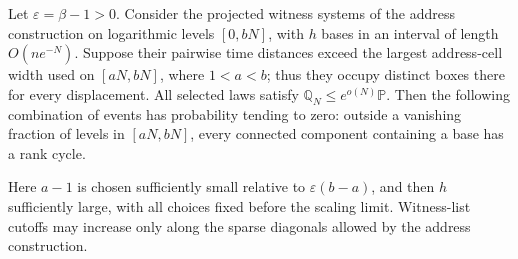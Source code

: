 \begin{proposition}\label{arm:rank-credit}
Let $\varepsilon=\beta-1>0$.  Consider the projected witness systems
of the address construction on logarithmic levels $[0,bN]$, with
$h$ bases in an interval of length $O(ne^{-N})$.  Suppose their
pairwise time distances exceed the largest address-cell width used
on $[aN,bN]$, where $1<a<b$; thus they occupy distinct boxes there
for every displacement.  All selected
laws satisfy $\mathbb Q_N\le e^{o(N)}\mathbb P$.  Then the following
combination of events has probability tending to zero: outside a
vanishing fraction of levels in $[aN,bN]$, every connected
component containing a base has a rank cycle.

Here $a-1$ is chosen sufficiently small relative to
$\varepsilon(b-a)$, and then $h$ sufficiently large, with all choices
fixed before the scaling limit.  Witness-list cutoffs may increase
only along the sparse diagonals allowed by the address construction.
\end{proposition}


